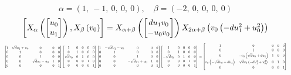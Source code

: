 \documentclass[11pt]{article}
\theoremstyle{definition}
\begin{document}
\[
\alpha = \left( 1, \  -1, \  0, \  0, \  0\right), \quad \beta = \left( -2, \  0, \  0, \  0, \  0\right)
\]
\[
\scaletoalign{\textwidth}{\left[ X_{\alpha}\left(\left[\begin{matrix}u_{0}\\u_{1}\end{matrix}\right]\right), X_{\beta}\left(v_{0}\right) \right] = X_{\alpha + \beta}\left(\left[\begin{matrix}d u_{1} v_{0}\\- u_{0} v_{0}\end{matrix}\right]\right) X_{2\alpha + \beta}\left(v_{0} \left(- d u_{1}^{2} + u_{0}^{2}\right)\right)}
\]
\[
\scaletoalign{\textwidth}{{\left[\begin{matrix}1 & \sqrt{d} u_{1} + u_{0} & 0 & 0 & 0\\0 & 1 & 0 & 0 & 0\\0 & 0 & 1 & 0 & 0\\0 & 0 & \sqrt{d} u_{1} - u_{0} & 1 & 0\\0 & 0 & 0 & 0 & 1\end{matrix}\right]} {\left[\begin{matrix}1 & 0 & 0 & 0 & 0\\0 & 1 & 0 & 0 & 0\\\sqrt{d} v_{0} & 0 & 1 & 0 & 0\\0 & 0 & 0 & 1 & 0\\0 & 0 & 0 & 0 & 1\end{matrix}\right]} {\left[\begin{matrix}1 & - \sqrt{d} u_{1} - u_{0} & 0 & 0 & 0\\0 & 1 & 0 & 0 & 0\\0 & 0 & 1 & 0 & 0\\0 & 0 & - \sqrt{d} u_{1} + u_{0} & 1 & 0\\0 & 0 & 0 & 0 & 1\end{matrix}\right]} {\left[\begin{matrix}1 & 0 & 0 & 0 & 0\\0 & 1 & 0 & 0 & 0\\- \sqrt{d} v_{0} & 0 & 1 & 0 & 0\\0 & 0 & 0 & 1 & 0\\0 & 0 & 0 & 0 & 1\end{matrix}\right]} = {\left[\begin{matrix}1 & 0 & 0 & 0 & 0\\0 & 1 & 0 & 0 & 0\\0 & - v_{0} \left(\sqrt{d} u_{0} + d u_{1}\right) & 1 & 0 & 0\\v_{0} \left(- \sqrt{d} u_{0} + d u_{1}\right) & \sqrt{d} v_{0} \left(- d u_{1}^{2} + u_{0}^{2}\right) & 0 & 1 & 0\\0 & 0 & 0 & 0 & 1\end{matrix}\right]}}
\]
\end{document}
